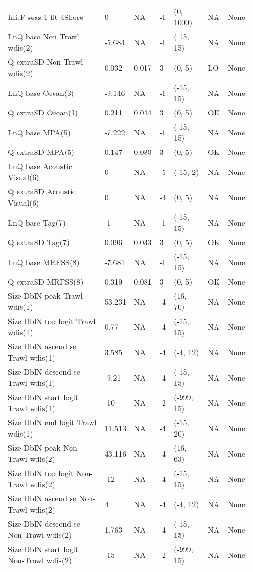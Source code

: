 \documentclass[11pt,
  letterpaper,
]{article}
\begin{document}
\begin{landscape}
\begin{longtable}[t]{>{\raggedright\arraybackslash}p{7.5cm}lllll>{\raggedright\arraybackslash}p{3.5cm}}
InitF seas 1 flt 4Shore & 0 & NA & -1 & (0, 1000) & NA & None\\
LnQ base Non-Trawl wdis(2) & -5.684 & NA & -1 & (-15, 15) & NA & None\\
Q extraSD Non-Trawl wdis(2) & 0.032 & 0.017 & 3 & (0, 5) & LO & None\\
LnQ base Ocean(3) & -9.146 & NA & -1 & (-15, 15) & NA & None\\
Q extraSD Ocean(3) & 0.211 & 0.044 & 3 & (0, 5) & OK & None\\
LnQ base MPA(5) & -7.222 & NA & -1 & (-15, 15) & NA & None\\
Q extraSD MPA(5) & 0.147 & 0.080 & 3 & (0, 5) & OK & None\\
LnQ base Acoustic Visual(6) & 0 & NA & -5 & (-15, 2) & NA & None\\
Q extraSD Acoustic Visual(6) & 0 & NA & -3 & (0, 5) & NA & None\\
LnQ base Tag(7) & -1 & NA & -1 & (-15, 15) & NA & None\\
Q extraSD Tag(7) & 0.096 & 0.033 & 3 & (0, 5) & OK & None\\
LnQ base MRFSS(8) & -7.681 & NA & -1 & (-15, 15) & NA & None\\
Q extraSD MRFSS(8) & 0.319 & 0.081 & 3 & (0, 5) & OK & None\\
Size DblN peak Trawl wdis(1) & 53.231 & NA & -4 & (16, 70) & NA & None\\
Size DblN top logit Trawl wdis(1) & 0.77 & NA & -4 & (-15, 15) & NA & None\\
Size DblN ascend se Trawl wdis(1) & 3.585 & NA & -4 & (-4, 12) & NA & None\\
Size DblN descend se Trawl wdis(1) & -9.21 & NA & -4 & (-15, 15) & NA & None\\
Size DblN start logit Trawl wdis(1) & -10 & NA & -2 & (-999, 15) & NA & None\\
Size DblN end logit Trawl wdis(1) & 11.513 & NA & -4 & (-15, 20) & NA & None\\
Size DblN peak Non-Trawl wdis(2) & 43.116 & NA & -4 & (16, 63) & NA & None\\
Size DblN top logit Non-Trawl wdis(2) & -12 & NA & -4 & (-15, 15) & NA & None\\
Size DblN ascend se Non-Trawl wdis(2) & 4 & NA & -4 & (-4, 12) & NA & None\\
Size DblN descend se Non-Trawl wdis(2) & 1.763 & NA & -4 & (-15, 15) & NA & None\\
Size DblN start logit Non-Trawl wdis(2) & -15 & NA & -2 & (-999, 15) & NA & None\\

\end{longtable}
\end{landscape}
\end{document}

